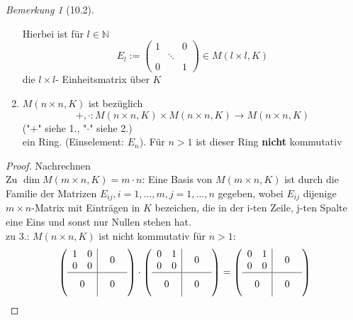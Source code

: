 \documentclass[a4paper]{scrartcl}
\theoremstyle{definition}
\theoremstyle{plain}
\theoremstyle{plain}
\theoremstyle{remark}
\newtheorem{remark}{Bemerkung}
\theoremstyle{remark}
\theoremstyle{remark}
\theoremstyle{remark}
\theoremstyle{remark}
\begin{document}
\begin{remark}[10.2]
\begin{enumerate}
\begin{itemize}
\end{itemize}
Hierbei ist für $l \in \mathbb{N}$
\[E_l := \begin{pmatrix} 1 & & 0 \\ & \ddots & \\ 0 & & 1 \end{pmatrix} \in M(l\times l, K)\]
die $l\times l$- Einheitsmatrix über $K$
\item $M(n\times n, K)$ ist bezüglich
\[+,\cdot : M(n\times n, K) \times M(n\times n, K) \to M(n\times n, K)\]
("$+$" siehe 1., "$\cdot$" siehe 2.) \\
     ein Ring. (Einselement: $E_n$). Für $n > 1$ ist dieser Ring \textbf{nicht} kommutativ
\end{enumerate}
\end{remark}
\begin{proof}
Nachrechnen \\
  Zu $\dim M(m\times n, K) = m\cdot n$: Eine Basis von $M(m\times n, K)$ ist durch die Familie der Matrizen $E_{ij}, i = 1, \ldots, m, j = 1,\ldots, n$ gegeben, wobei $E_{ij}$ dijenige $m\times n$-Matrix mit Einträgen in $K$ bezeichen, die in der i-ten Zeile, j-ten Spalte eine Eins
und sonst nur Nullen stehen hat. \\
  zu 3.: $M(n\times n, K)$ ist nicht kommutativ für $n > 1$:
\begin{align*}
&\sbox0{$\begin{matrix} 1 & 0 \\ 0 & 0 \end{matrix}$}%
\sbox1{$\begin{matrix} 0 & 1 \\ 0 & 0 \end{matrix}$}%
\left(
\begin{array}{c|c}
\usebox{0}&\makebox[\wd0]{$0$} \\
\hline
\vphantom{\usebox{0}}\makebox[\wd0]{$0$}&\makebox[\wd0]{$0$}
\end{array}
\right)
\cdot
\left(
\begin{array}{c|c}
\usebox{1}&\makebox[\wd1]{$0$} \\
\hline
\vphantom{\usebox{1}}\makebox[\wd1]{$0$}&\makebox[\wd1]{$0$}
\end{array}
\right)
=
\left(
\begin{array}{c|c}
\usebox{1}&\makebox[\wd1]{$0$} \\
\hline
\vphantom{\usebox{1}}\makebox[\wd1]{$0$}&\makebox[\wd1]{$0$}
\end{array}
\right) \\

\end{align*}
\end{proof}
\end{document}
